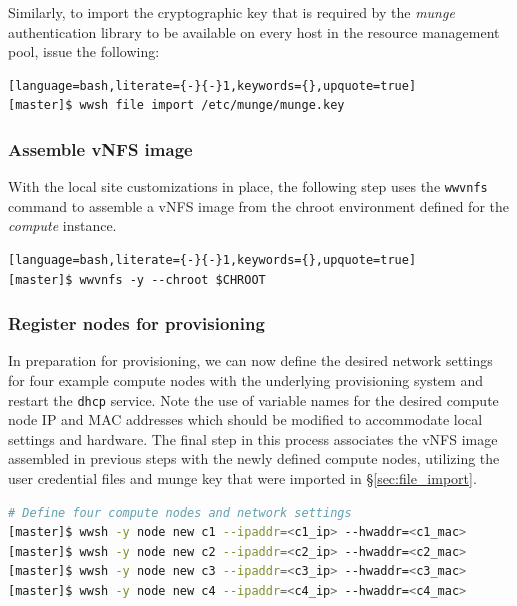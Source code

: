 \documentclass[letterpaper]{article}
\begin{document}
{Similarly, to import the cryptographic key that is required by the {\em munge}
authentication library to be available on every host in the resource management
pool, issue the following:

\begin{lstlisting}[language=bash,literate={-}{-}1,keywords={},upquote=true]
[master]$ wwsh file import /etc/munge/munge.key
\end{lstlisting}


\subsubsection{Assemble vNFS image}

With the local site customizations in place, the following step uses the
\texttt{wwvnfs} command to assemble a vNFS image from the chroot environment
defined for the {\em compute} instance. 

\begin{lstlisting}[language=bash,literate={-}{-}1,keywords={},upquote=true]
[master]$ wwvnfs -y --chroot $CHROOT
\end{lstlisting}

\subsubsection{Register nodes for provisioning}

In preparation for provisioning, we can now define the desired network settings
for four example compute nodes with the underlying provisioning system and
restart the \texttt{dhcp} service. Note the use of variable names for the
desired compute node IP and MAC addresses which should be modified to
accommodate local settings and hardware. The final step in this process
associates the vNFS image assembled in previous steps with the newly defined
compute nodes, utilizing the user credential files and munge key that were
imported in \S\ref{sec:file_import}.


\begin{lstlisting}[language=bash,keywords={},upquote=true,basicstyle=\footnotesize\ttfamily]
# Define four compute nodes and network settings 
[master]$ wwsh -y node new c1 --ipaddr=<c1_ip> --hwaddr=<c1_mac> 
[master]$ wwsh -y node new c2 --ipaddr=<c2_ip> --hwaddr=<c2_mac> 
[master]$ wwsh -y node new c3 --ipaddr=<c3_ip> --hwaddr=<c3_mac> 
[master]$ wwsh -y node new c4 --ipaddr=<c4_ip> --hwaddr=<c4_mac> 


\end{lstlisting}}
\end{document}

